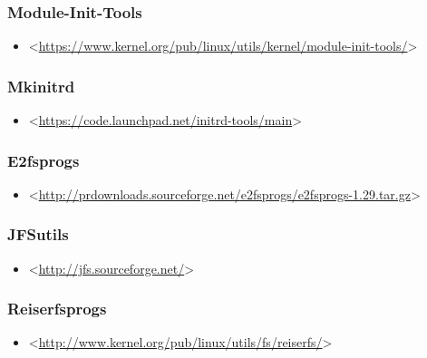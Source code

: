 \documentclass[a4paper,8pt,english]{sphinxmanual}
\begin{document}
\subsubsection{Module-Init-Tools}
\label{process/changes:id12}\begin{itemize}
\item {} 
\textless{}\href{https://www.kernel.org/pub/linux/utils/kernel/module-init-tools/}{https://www.kernel.org/pub/linux/utils/kernel/module-init-tools/}\textgreater{}

\end{itemize}


\subsubsection{Mkinitrd}
\label{process/changes:id13}\begin{itemize}
\item {} 
\textless{}\href{https://code.launchpad.net/initrd-tools/main}{https://code.launchpad.net/initrd-tools/main}\textgreater{}

\end{itemize}


\subsubsection{E2fsprogs}
\label{process/changes:id14}\begin{itemize}
\item {} 
\textless{}\href{http://prdownloads.sourceforge.net/e2fsprogs/e2fsprogs-1.29.tar.gz}{http://prdownloads.sourceforge.net/e2fsprogs/e2fsprogs-1.29.tar.gz}\textgreater{}

\end{itemize}


\subsubsection{JFSutils}
\label{process/changes:id15}\begin{itemize}
\item {} 
\textless{}\href{http://jfs.sourceforge.net/}{http://jfs.sourceforge.net/}\textgreater{}

\end{itemize}


\subsubsection{Reiserfsprogs}
\label{process/changes:id16}\begin{itemize}
\item {} 
\textless{}\href{http://www.kernel.org/pub/linux/utils/fs/reiserfs/}{http://www.kernel.org/pub/linux/utils/fs/reiserfs/}\textgreater{}

\end{itemize}
\end{document}
